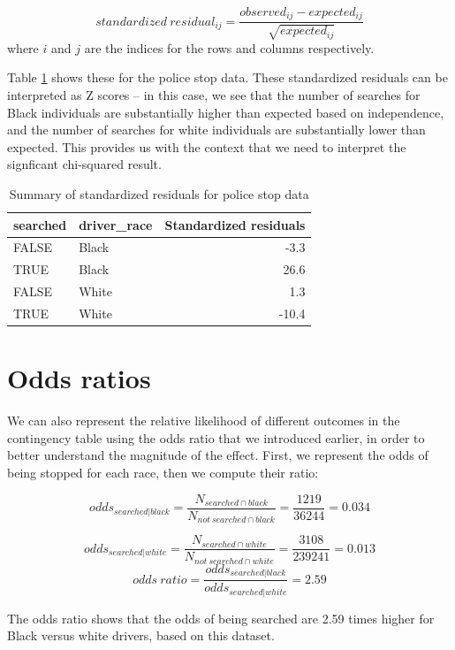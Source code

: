 \documentclass[
  12pt,
]{book}
\begin{document}
\[
standardized\ residual_{ij} = \frac{observed_{ij} - expected_{ij}}{\sqrt{expected_{ij}}}
\]
where \(i\) and \(j\) are the indices for the rows and columns respectively.

Table \ref{tab:stdRes} shows these for the police stop data. These standardized residuals can be interpreted as Z scores -- in this case, we see that the number of searches for Black individuals are substantially higher than expected based on independence, and the number of searches for white individuals are substantially lower than expected. This provides us with the context that we need to interpret the signficant chi-squared result.

\begin{table}

\caption{\label{tab:stdRes}Summary of standardized residuals for police stop data}
\centering
\begin{tabular}[t]{l|l|r}
\hline
searched & driver\_race & Standardized residuals\\
\hline
FALSE & Black & -3.3\\
\hline
TRUE & Black & 26.6\\
\hline
FALSE & White & 1.3\\
\hline
TRUE & White & -10.4\\
\hline
\end{tabular}
\end{table}

\hypertarget{odds-ratios}{%
\section{Odds ratios}\label{odds-ratios}}

We can also represent the relative likelihood of different outcomes in the contingency table using the odds ratio that we introduced earlier, in order to better understand the magnitude of the effect. First, we represent the odds of being stopped for each race, then we compute their ratio:

\[
odds_{searched|black} = \frac{N_{searched\cap black}}{N_{not\ searched\cap black}} = \frac{1219}{36244} = 0.034
\]

\[
odds_{searched|white} = \frac{N_{searched\cap white}}{N_{not\ searched\cap white}} = \frac{3108}{239241} = 0.013
\]
\[
odds\ ratio = \frac{odds_{searched|black}}{odds_{searched|white}} = 2.59
\]

The odds ratio shows that the odds of being searched are 2.59 times higher for Black versus white drivers, based on this dataset.
\end{document}
